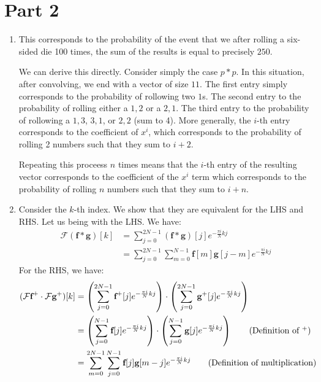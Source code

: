 \documentclass[12pt]{article}
\begin{document}
\newpage
\section*{Part 2}

\begin{enumerate}[label=(\alph*)]
  \item This corresponds to the probability of the event that we after rolling a six-sided die 100 times, the sum of the results is equal to precisely $250$. 

  We can derive this directly. Consider simply the case $p * p$. In this situation, after convolving, we end with a vector of size $11$. The first entry simply corresponds to the probability of rollowing two $1$s. The second entry to the probability of rolling either a $1,2$ or a $2,1$. The third entry to the probability of rollowing a $1,3$, $3,1$, or $2,2$ (sum to 4). More generally, the $i$-th entry corresponds to the coefficient of $x^i$, which corresponds to the probability of rolling 2 numbers such that they sum to $i + 2$.

  Repeating this proceess $n$ times means that the $i$-th entry of the resulting vector corresponds to the coefficient of the $x^i$ term which corresponds to the probability of rolling $n$ numbers such that they sum to $i + n$.

  \item Consider the $k$-th index. We show that they are equivalent for the LHS and RHS. Let us being with the LHS. We have:
  \begin{align*}
    \mathcal{F}(\textbf{f} * \textbf{g})[k] &= \sum_{j=0}^{2N-1} (\textbf{f} * \textbf{g})[j]e^{-\frac{\pi i}{N}kj} \tag{Definition of discrete fourier transform} \\
    &= \sum_{j=0}^{2N - 1} \sum_{m=0}^{N-1} \textbf{f}[m]\textbf{g}[j - m]e^{-\frac{\pi i}{N}kj}
  \end{align*}
  For the RHS, we have:
  \begin{align*}
    (\mathcal{F}\textbf{f}^{+} \cdot \mathcal{F}\textbf{g}^{+})[k] &= \left( \sum_{j=0}^{2N - 1} \textbf{f}^{+}[j]e^{- \frac{\pi i}{N} kj} \right) \cdot \left( \sum_{j=0}^{2N-1} \textbf{g}^{+}[j]e^{- \frac{\pi i}{N} kj} \right) \\
    &= \left( \sum_{j=0}^{N - 1} \textbf{f}[j]e^{- \frac{\pi i}{N} kj} \right) \cdot \left( \sum_{j=0}^{N-1} \textbf{g}[j]e^{- \frac{\pi i}{N} kj} \right) \tag{Definition of $^{+}$} \\
    &= \sum_{m=0}^{2N - 1} \sum_{j=0}^{N-1} \textbf{f}[j]\textbf{g}[m - j]e^{-\frac{\pi i}{N}kj} \tag{Definition of multiplication}
  \end{align*}


\end{enumerate}
\end{document}
